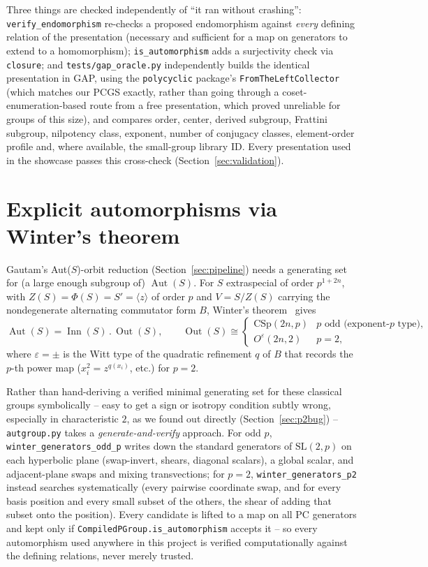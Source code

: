 \documentclass[11pt]{article}
\theoremstyle{remark}
\begin{document}
Three things are checked independently of ``it ran without crashing'':
\texttt{verify\_endomorphism} re-checks a proposed endomorphism against
\emph{every} defining relation of the presentation (necessary and
sufficient for a map on generators to extend to a homomorphism);
\texttt{is\_automorphism} adds a surjectivity check via
\texttt{closure}; and \texttt{tests/gap\_oracle.py} independently builds the
identical presentation in GAP, using the \texttt{polycyclic} package's
\texttt{FromTheLeftCollector} (which matches our PCGS exactly, rather than
going through a coset-enumeration-based route from a free presentation,
which proved unreliable for groups of this size), and compares order,
center, derived subgroup, Frattini subgroup, nilpotency class, exponent,
number of conjugacy classes, element-order profile and, where available,
the small-group library ID. Every presentation used in the showcase passes
this cross-check (Section~\ref{sec:validation}).

\section{Explicit automorphisms via Winter's theorem}
\label{sec:winter}

Gautam's Aut($S$)-orbit reduction (Section~\ref{sec:pipeline}) needs a
generating set for (a large enough subgroup of) $\operatorname{Aut}(S)$. For
$S$ extraspecial of order $p^{1+2n}$, with $Z(S)=\Phi(S)=S'=\langle z
\rangle$ of order $p$ and $V = S/Z(S)$ carrying the nondegenerate alternating
commutator form $B$, Winter's theorem~\cite{winter1972} gives
\[
  \operatorname{Aut}(S) = \operatorname{Inn}(S)\,.\,\operatorname{Out}(S),
  \qquad
  \operatorname{Out}(S) \cong
  \begin{cases}
    \mathrm{CSp}(2n,p) & p \text{ odd (exponent-}p\text{ type)}, \\
    O^{\varepsilon}(2n,2) & p = 2,
  \end{cases}
\]
where $\varepsilon = \pm$ is the Witt type of the quadratic refinement $q$ of
$B$ that records the $p$-th power map ($x_i^2 = z^{q(x_i)}$, etc.) for
$p=2$.

Rather than hand-deriving a verified minimal generating set for these
classical groups symbolically -- easy to get a sign or isotropy condition
subtly wrong, especially in characteristic $2$, as we found out directly
(Section~\ref{sec:p2bug}) -- \texttt{autgroup.py} takes a
\emph{generate-and-verify} approach. For odd $p$, \texttt{winter\_generators\_odd\_p}
writes down the standard generators of $\mathrm{SL}(2,p)$ on each
hyperbolic plane (swap-invert, shears, diagonal scalars), a global scalar,
and adjacent-plane swaps and mixing transvections; for $p=2$,
\texttt{winter\_generators\_p2} instead searches systematically (every
pairwise coordinate swap, and for every basis position and every small
subset of the others, the shear of adding that subset onto the position).
Every candidate is lifted to a map on all PC generators and kept only if
\texttt{CompiledPGroup.is\_automorphism} accepts it -- so every automorphism
used anywhere in this project is verified computationally against the
defining relations, never merely trusted.
\end{document}
